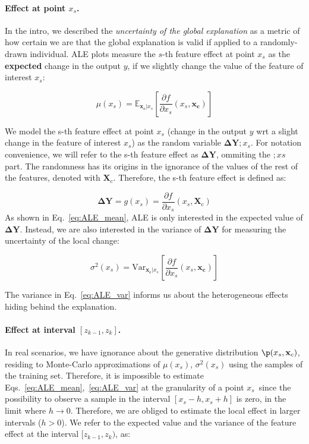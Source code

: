 \documentclass{article}
\newcommand{\dfdx}{\frac{\partial f}{\partial x_s}}
\newcommand{\xc}{\mathbf{x_c}}
\newcommand{\DY}{\mathbf{\Delta Y}}
\begin{document}
\paragraph{Effect at point \(x_s\).} In the intro, we described the
\textit{uncertainty of the global explanation} as a metric of how
certain we are that the global explanation is valid if applied to a
randomly-drawn individual.
ALE plots measure the \(s\)-th feature
effect at point \(x_s\) as the \textbf{expected} change in the output \(y\), if
we slightly change the value of the feature of interest \(x_s\):

\begin{equation}
  \label{eq:ALE_mean}
  \mu(x_s) = \mathbb{E}_{\xc|x_s}\left [\dfdx (x_s, \xc)\right ]
\end{equation}

\noindent
We model the s-th feature effect at point \(x_s\) (change in the output \(y\) wrt a slight change in the feature of interest \(x_s\)) as the random variable $\DY ; x_s $.
For notation convenience, we will refer to the s-th feature effect as \(\DY\), ommiting the \(;xs\) part.
The randomness has its origins in the ignorance of the values of the rest of the features, denoted with \(\mathbf{X}_c\).
Therefore, the s-th feature effect is defined as:

\begin{equation}
  \label{eq:fe_rv}
  \DY = g(x_s) = \dfdx (x_s, \mathbf{X}_c)
\end{equation}
%
As shown in Eq.~\eqref{eq:ALE_mean}, ALE is only interested in the expected value of \(\DY\).
Instead, we are also interested in the variance of \(\DY\) for measuring the uncertainty of the local change:

\begin{equation}
  \label{eq:ALE_var}
  \sigma^2(x_s) = \mathrm{Var}_{\xc|x_s}\left [\dfdx (x_s, \xc) \right ]
\end{equation}

\noindent
The variance in Eq.~\eqref{eq:ALE_var} informs us about the heterogeneous
effects hiding behind the explanation.

\paragraph{Effect at interval \([z_{k-1}, z_k]\).}

In real scenarios, we have ignorance about the generative distribution \(\p(x_s, \mathbf{x}_c)\),
residing to Monte-Carlo approximations of \(\mu(x_s)\), \(\sigma^2(x_s)\) using the samples of the training set.
Therefore, it is impossible to estimate Eqs.~\eqref{eq:ALE_mean},~\eqref{eq:ALE_var} at the granularity of a
point \(x_s\)\, since the  possibility to observe a sample in the interval
\([x_s - h, x_s + h]\) is zero, in the limit where \(h \to 0\).
Therefore, we are obliged to estimate the local effect in larger intervals (\(h>0\)).
We refer to the expected value and the variance of the feature effect at the interval \([z_{k-1}, z_k)\), as:
\end{document}

